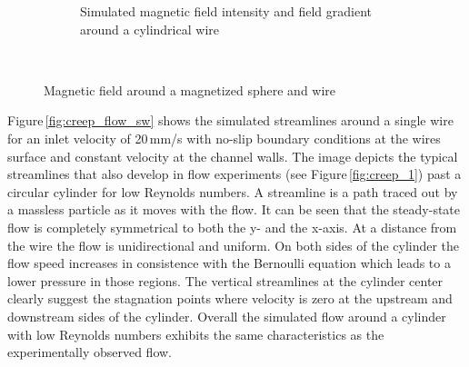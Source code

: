 \begin{figure}[H]
\begin{subfigure}{0.49\textwidth}
                \caption{Simulated magnetic field intensity and field gradient around a cylindrical wire \cite{lindner2013simulation}}\label{fig:mag_field_nirschl}
        \end{subfigure}
        \\
        
        \caption[Magnetic field around a magnetized sphere and wire]{Magnetic field around a magnetized sphere and wire}
        \label{fig:esem_prax}
  \end{figure}

 
Figure\,\ref{fig:creep_flow_sw} shows the simulated streamlines around a single wire for an inlet velocity of 20\,mm/s with no-slip boundary conditions at the wires surface and constant velocity at the channel walls. The image depicts the typical streamlines that also develop in flow experiments (see Figure\,\ref{fig:creep_1}) past a circular cylinder for low Reynolds numbers.  A streamline is a path traced out by a massless particle as it moves with the flow. It can be seen that the steady-state flow is completely symmetrical to both the y- and the x-axis. At a distance from the wire the flow is unidirectional and uniform. On both sides of the cylinder the flow speed increases in consistence with the Bernoulli equation which leads to a lower pressure in those regions. The vertical streamlines at the cylinder center clearly suggest the stagnation points where velocity is zero at the upstream and downstream sides of the cylinder. Overall the simulated flow around a cylinder with low Reynolds numbers exhibits the same characteristics as the experimentally observed flow. 
% 
% 
  
